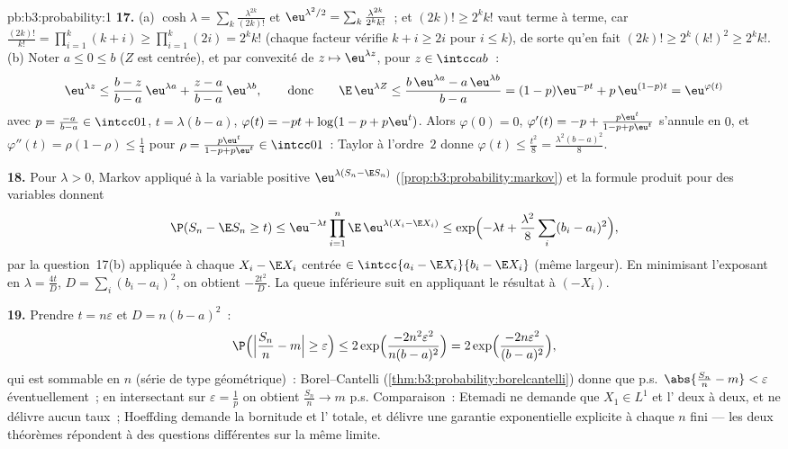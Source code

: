 \begin{solution}{pb:b3:probability:1}
\textbf{17.} (a) $\cosh\lambda =
\sum_k\frac{\lambda^{2k}}{(2k)!}$ et $\eu^{\lambda^2/2} =
\sum_k\frac{\lambda^{2k}}{2^kk!}$~; et $(2k)! \geq 2^kk!$
vaut terme à terme, car $\frac{(2k)!}{k!} =
\prod_{i=1}^k(k + i) \geq \prod_{i=1}^k(2i) = 2^kk!$
(chaque facteur vérifie $k + i \geq 2i$ pour $i \leq k$),
de sorte qu'en fait $(2k)! \geq 2^k(k!)^2 \geq 2^kk!$.
(b) Noter $a \leq 0 \leq b$ ($Z$ est centrée), et par
convexité de $z \mapsto \eu^{\lambda z}$, pour $z \in
\intcc ab$~:
\[
\eu^{\lambda z} \leq \frac{b - z}{b - a}\,\eu^{\lambda a} +
\frac{z - a}{b - a}\,\eu^{\lambda b},
\qquad\text{donc}\qquad
\E\,\eu^{\lambda Z} \leq \frac{b\,\eu^{\lambda a} -
a\,\eu^{\lambda b}}{b - a}
= (1 - p)\eu^{-pt} + p\,\eu^{(1-p)t} = \eu^{\varphi(t)}
\]
avec $p = \frac{-a}{b-a} \in \intcc01$, $t = \lambda(b -
a)$, $\varphi(t) = -pt + \log(1 - p + p\eu^t)$. Alors
$\varphi(0) = 0$, $\varphi'(t) = -p + \frac{p\eu^t}{1 - p +
p\eu^t}$ s'annule en $0$, et $\varphi''(t) = \rho(1 -
\rho) \leq \frac14$ pour $\rho = \frac{p\eu^t}{1 - p +
p\eu^t} \in \intcc01$~: Taylor à l'ordre~$2$ donne
$\varphi(t) \leq \frac{t^2}8 = \frac{\lambda^2(b-a)^2}8$.

\textbf{18.} Pour $\lambda > 0$, Markov appliqué à la
variable positive $\eu^{\lambda(S_n - \E S_n)}$
(\cref{prop:b3:probability:markov}) et la formule produit
pour des variables  donnent
\[
\P(S_n - \E S_n \geq t) \leq \eu^{-\lambda
t}\prod_{i=1}^n\E\,\eu^{\lambda(X_i - \E X_i)}
\leq \exp\Bigl(-\lambda t +
\frac{\lambda^2}8\sum_i(b_i - a_i)^2\Bigr),
\]
par la question~17(b) appliquée à chaque $X_i - \E X_i$
centrée $\in \intcc{a_i - \E X_i}{b_i - \E X_i}$ (même
largeur). En minimisant l'exposant en $\lambda =
\frac{4t}{D}$, $D = \sum_i(b_i - a_i)^2$, on obtient
$-\frac{2t^2}D$. La queue inférieure suit en appliquant le
résultat à $(-X_i)$.

\textbf{19.} Prendre $t = n\varepsilon$ et $D = n(b -
a)^2$~:
\[
\P\Bigl(\Bigl|\frac{S_n}n - m\Bigr| \geq \varepsilon\Bigr)
\leq 2\exp\Bigl(\frac{-2n^2\varepsilon^2}{n(b-a)^2}\Bigr)
= 2\exp\Bigl(\frac{-2n\varepsilon^2}{(b-a)^2}\Bigr),
\]
qui est sommable en $n$ (série de type géométrique)~:
Borel--Cantelli (\cref{thm:b3:probability:borelcantelli})
donne que p.s.\ $\abs{\frac{S_n}n - m} < \varepsilon$
éventuellement~; en intersectant sur $\varepsilon =
\frac1p$ on obtient $\frac{S_n}n \to m$ p.s. Comparaison~:
Etemadi ne demande que $X_1 \in L^1$ et l' deux
à deux, et ne délivre aucun taux~; Hoeffding demande la
bornitude et l' totale, et délivre une
garantie exponentielle explicite à chaque $n$ fini --- les
deux théorèmes répondent à des questions différentes sur
la même limite.


\end{solution}
